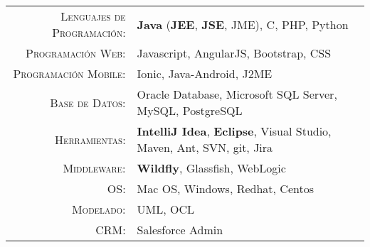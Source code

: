\renewcommand{\arraystretch}{1.1}

	\begin{tabular}{>{}r>{}p{13cm}}
		\textsc{Lenguajes de Programación:}  		&   \textbf{Java} (\textbf{JEE}, \textbf{JSE}, JME), C, PHP, Python\\
		\textsc{Programación Web:}               	&   Javascript, AngularJS, Bootstrap, CSS\\
		\textsc{Programación Mobile:}               &   Ionic, Java-Android, J2ME\\
		\textsc{Base de Datos:}                     &   Oracle Database, Microsoft SQL Server, MySQL, PostgreSQL \\
		\textsc{Herramientas:}	  		            &   \textbf {IntelliJ Idea}, \textbf {Eclipse}, Visual Studio, Maven, Ant, SVN, git, Jira\\
		\textsc{Middleware:}				        &   \textbf{Wildfly}, Glassfish, WebLogic\\
		\textsc{OS:}	                            &   Mac OS, Windows, Redhat, Centos\\
		\textsc{Modelado:}				            &   UML, OCL\\
		\textsc{CRM:}				                &   Salesforce Admin\\
	\end{tabular}
